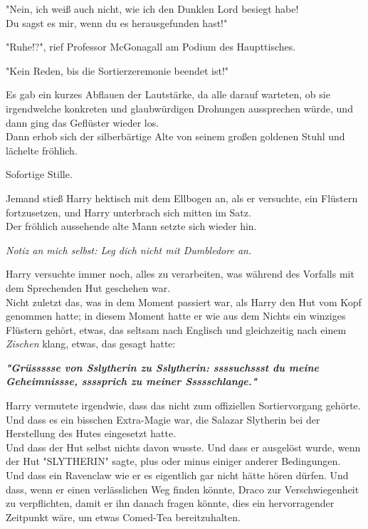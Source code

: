 {"Nein, ich weiß auch nicht, wie ich den Dunklen Lord besiegt habe!\\ Du sagst es mir, wenn du es herausgefunden hast!"

"Ruhe!?", rief Professor McGonagall am Podium des Haupttisches.

"Kein Reden, bis die Sortierzeremonie beendet ist!"

Es gab ein kurzes Abflauen der Lautstärke, da alle darauf warteten, ob sie irgendwelche konkreten und glaubwürdigen Drohungen aussprechen würde, und dann ging das Geflüster wieder los.\\ Dann erhob sich der silberbärtige Alte von seinem großen goldenen Stuhl und lächelte fröhlich.

Sofortige Stille.

Jemand stieß Harry hektisch mit dem Ellbogen an, als er versuchte, ein Flüstern fortzusetzen, und Harry unterbrach sich mitten im Satz.\\ Der fröhlich aussehende alte Mann setzte sich wieder hin.

\emph{Notiz an mich selbst: Leg dich nicht mit Dumbledore an.}

Harry versuchte immer noch, alles zu verarbeiten, was während des Vorfalls mit dem Sprechenden Hut geschehen war.\\ Nicht zuletzt das, was in dem Moment passiert war, als Harry den Hut vom Kopf genommen hatte; in diesem Moment hatte er wie aus dem Nichts ein winziges Flüstern gehört, etwas, das seltsam nach Englisch und gleichzeitig nach einem \emph{Zischen} klang, etwas, das gesagt hatte:

\textbf{\emph{"Grüssssse von Sslytherin zu Sslytherin: ssssuchssst du meine Geheimnissse, ssssprich zu meiner Ssssschlange."}}

Harry vermutete irgendwie, dass das nicht zum offiziellen Sortiervorgang gehörte.\\ Und dass es ein bisschen Extra-Magie war, die Salazar Slytherin bei der Herstellung des Hutes eingesetzt hatte.\\ Und dass der Hut selbst nichts davon wusste. Und dass er ausgelöst wurde, wenn der Hut "SLYTHERIN" sagte, plus oder minus einiger anderer Bedingungen.\\ Und dass ein Ravenclaw wie er es eigentlich gar nicht hätte hören dürfen. Und dass, wenn er einen verlässlichen Weg finden könnte, Draco zur Verschwiegenheit zu verpflichten, damit er ihn danach fragen könnte, dies ein hervorragender Zeitpunkt wäre, um etwas Comed-Tea bereitzuhalten.

}
